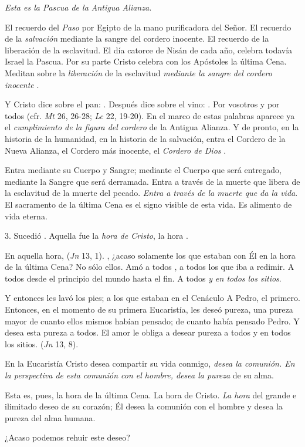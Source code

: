 \begin{body}
\textit{Esta es la Pascua de la Antigua Alianza.}

El recuerdo del \textit{Paso} por Egipto de la mano purificadora del Señor. El recuerdo de la \textit{salvación} mediante la sangre del cordero inocente. El recuerdo de la liberación de la esclavitud. El día catorce de Nisán de cada año, celebra todavía Israel la Pascua. Por su parte Cristo celebra con los Apóstoles la última Cena. Meditan sobre la \textit{liberación} de la esclavitud \textit{mediante la sangre del cordero inocente} . 

Y Cristo dice sobre el pan: . Después dice sobre el vino: . Por vosotros y por todos (cfr. \textit{Mt} 26, 26-28; \textit{Lc} 22, 19-20). En el marco de estas palabras aparece ya el \textit{cumplimiento de la figura del cordero} de la Antigua Alianza. Y de pronto, en la historia de la humanidad, en la historia de la salvación, entra el Cordero de la Nueva Alianza, el Cordero más inocente, el \textit{Cordero de Dios} . 

Entra mediante su Cuerpo y Sangre; mediante el Cuerpo que será entregado, mediante la Sangre que será derramada. Entra a través de la muerte que libera de la esclavitud de la muerte del pecado. \textit{Entra a través de la muerte que da la vida}. El sacramento de la última Cena es el signo visible de esta vida. Es alimento de vida eterna. 

3. Sucedió . Aquella fue la \textit{hora de Cristo}, la hora . 

En aquella hora,  (\textit{Jn} 13, 1). , ¿acaso solamente los que estaban con Él en la hora de la última Cena? No sólo ellos. Amó a todos , a todos los que iba a redimir. A todos desde el principio del mundo hasta el fin. A todos \textit{y en todos los sitios}. 

Y entonces les lavó los pies; a los que estaban en el Cenáculo A Pedro, el primero. Entonces, en el momento de su primera Eucaristía, les deseó pureza, una pureza mayor de cuanto ellos mismos habían pensado; de cuanto había pensado Pedro. Y desea esta pureza a todos. El amor le obliga a desear pureza a todos y en todos los sitios.  (\textit{Jn} 13, 8). 

En la Eucaristía Cristo desea compartir su vida conmigo, \textit{desea la comunión. En la perspectiva de esta comunión con el hombre, desea la pureza} de su alma.

Esta es, pues, la hora de la última Cena. La hora de Cristo. \textit{La hora} del grande e ilimitado deseo de su corazón; Él desea la comunión con el hombre y desea la pureza del alma humana. 

¿Acaso podemos rehuir este deseo?
\end{body}

